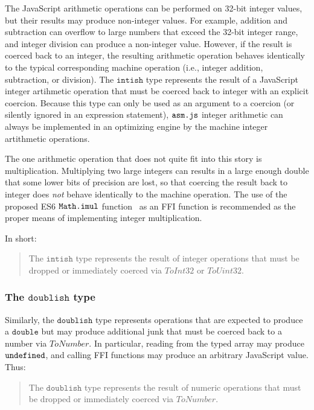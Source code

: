 \documentclass{article}
\newcommand{\mathjs}[1]{\mbox{\texttt{{#1}}}}
\newcommand{\double}{\mathtt{double}}
\newcommand{\intish}{\mathtt{intish}}
\newcommand{\doublish}{\mathtt{doublish}}
\begin{document}
The JavaScript arithmetic operations can be performed on 32-bit
integer values, but their results may produce non-integer values. For
example, addition and subtraction can overflow to large numbers that
exceed the 32-bit integer range, and integer division can produce a
non-integer value. However, if the result is coerced back to an
integer, the resulting arithmetic operation behaves identically to the
typical corresponding machine operation (i.e., integer addition,
subtraction, or division). The $\intish$ type represents the result of
a JavaScript integer artihmetic operation that must be coerced back to
integer with an explicit coercion. Because this type can only be used
as an argument to a coercion (or silently ignored in an expression
statement), $\mathjs{asm.js}$ integer arithmetic can always be
implemented in an optimizing engine by the machine integer artithmetic
operations.

The one arithmetic operation that does not quite fit into this story
is multiplication. Multiplying two large integers can results in a
large enough double that some lower bits of precision are lost, so
that coercing the result back to integer does {\it not} behave
identically to the machine operation. The use of the proposed ES6
$\mathjs{Math.imul}$ function~\cite{imul} as an FFI function is
recommended as the proper means of implementing integer
multiplication.

In short:

\begin{quote}
The $\intish$ type represents the result of integer operations that
must be dropped or immediately coerced via $\mathit{ToInt32}$ or
$\mathit{ToUint32}$.
\end{quote}

\subsubsection*{The $\doublish$ type}

Similarly, the $\doublish$ type represents operations that are
expected to produce a $\double$ but may produce additional junk that
must be coerced back to a number via $\mathit{ToNumber}$. In
particular, reading from the typed array may produce
$\mathjs{undefined}$, and calling FFI functions may produce an
arbitrary JavaScript value. Thus:

\begin{quote}
The $\doublish$ type represents the result of numeric operations that
must be dropped or immediately coerced via $\mathit{ToNumber}$.
\end{quote}
\end{document}
